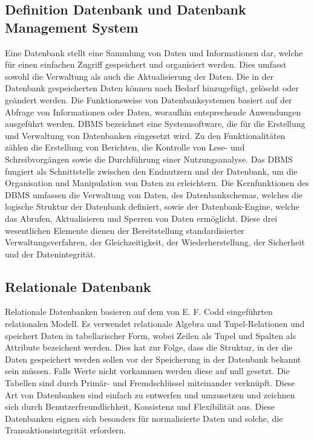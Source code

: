 \subsection{Definition Datenbank und Datenbank Management System} %
\label{sec:definitiondatenbank}
Eine Datenbank stellt eine Sammlung von Daten und Informationen dar, welche für einen einfachen Zugriff gespeichert und organisiert werden. Dies umfasst sowohl die Verwaltung als auch die Aktualisierung der Daten. Die in der Datenbank gespeicherten Daten können nach Bedarf hinzugefügt, gelöscht oder geändert werden. Die Funktionsweise von Datenbanksystemen basiert auf der Abfrage von Informationen oder Daten, woraufhin entsprechende Anwendungen ausgeführt werden. DBMS bezeichnet eine Systemsoftware, die für die Erstellung und Verwaltung von Datenbanken eingesetzt wird. Zu den Funktionalitäten zählen die Erstellung von Berichten, die Kontrolle von Lese- und Schreibvorgängen sowie die Durchführung einer Nutzungsanalyse. Das DBMS fungiert als Schnittstelle zwischen den Endnutzern und der Datenbank, um die Organisation und Manipulation von Daten zu erleichtern. Die Kernfunktionen des DBMS umfassen die Verwaltung von Daten, des Datenbankschemas, welches die logische Struktur der Datenbank definiert, sowie der Datenbank-Engine, welche das Abrufen, Aktualisieren und Sperren von Daten ermöglicht. Diese drei wesentlichen Elemente dienen der Bereitstellung standardisierter Verwaltungsverfahren, der Gleichzeitigkeit, der Wiederherstellung, der Sicherheit und der Datenintegrität. \citep{9677042}


\subsection{Relationale Datenbank} %
\label{sec:relationaleDatenbanken}
Relationale Datenbanken basieren auf dem von E. F. Codd eingeführten relationalen Modell. Es verwendet relationale Algebra und Tupel-Relationen und speichert Daten in tabellarischer Form, wobei Zeilen als Tupel und Spalten als Attribute bezeichent werden. Dies hat zur Folge, dass die Struktur, in der die Daten gespeichert werden sollen vor der Speicherung in der Datenbank bekannt sein müssen. Falls Werte nicht vorkammen werden diese auf null gesetzt. Die Tabellen sind durch Primär- und Fremdschlüssel miteinander verknüpft. Diese Art von Datenbanken sind einfach zu entwerfen und umzusetzen und zeichnen sich durch Benutzerfreundlichkeit, Konsistenz und Flexibilität aus. Diese Datenbanken eignen sich besonders für normalisierte Daten und solche, die Transaktionsintegrität erfordern.
 \citep{relationalDatabase}  \citep{9677042}
